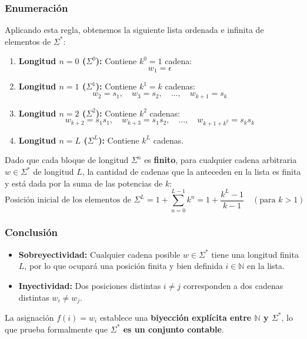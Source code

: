 \subsubsection*{Enumeración}

Aplicando esta regla, obtenemos la siguiente lista ordenada e infinita de elementos de $\Sigma^*$:

\begin{enumerate}[label=\arabic*., leftmargin=*]
    \item \textbf{Longitud $n = 0$ ($\Sigma^0$):} Contiene $k^0 = 1$ cadena:
    \[ w_1 = \epsilon \]
    \item \textbf{Longitud $n = 1$ ($\Sigma^1$):} Contiene $k^1 = k$ cadenas:
    \[ w_2 = s_1, \quad w_3 = s_2, \quad \dots, \quad w_{k+1} = s_k \]
    \item \textbf{Longitud $n = 2$ ($\Sigma^2$):} Contiene $k^2$ cadenas:
    \[ w_{k+2} = s_1 s_1, \quad w_{k+3} = s_1 s_2, \quad \dots, \quad w_{k+1+k^2} = s_k s_k \]
    \item \textbf{Longitud $n = L$ ($\Sigma^L$):} Contiene $k^L$ cadenas.
\end{enumerate}

Dado que cada bloque de longitud $\Sigma^n$ es \textbf{finito}, para cualquier cadena arbitraria $w \in \Sigma^*$ de longitud $L$, la cantidad de cadenas que la anteceden en la lista es finita y está dada por la suma de las potencias de $k$:
\[ 
\text{Posición inicial de los elementos de } \Sigma^L = 1 + \sum_{n=0}^{L-1} k^n = 1 + \frac{k^L - 1}{k - 1} \quad (\text{para } k > 1) 
\]
\subsubsection*{Conclusión}

\begin{itemize}[leftmargin=*]
    \item \textbf{Sobreyectividad:} Cualquier cadena posible $w \in \Sigma^*$ tiene una longitud finita $L$, por lo que ocupará una posición finita y bien definida $i \in \mathbb{N}$ en la lista.
    \item \textbf{Inyectividad:} Dos posiciones distintas $i \neq j$ corresponden a dos cadenas distintas $w_i \neq w_j$.
\end{itemize}

La asignación $f(i) = w_i$ establece una \textbf{biyección explícita entre $\mathbb{N}$ y $\Sigma^*$}, lo que prueba formalmente que \textbf{$\Sigma^*$ es un conjunto contable}.

